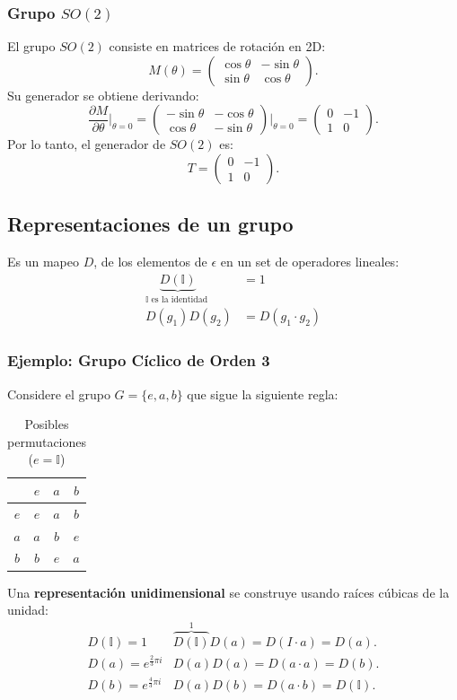 \documentclass[a4paper,12pt]{article}
\begin{document}
\subsubsection{Grupo \( SO(2) \)}
El grupo \( SO(2) \) consiste en matrices de rotación en 2D:
\[
M(\theta) = \begin{pmatrix}
\cos\theta & -\sin\theta \\
\sin\theta & \cos\theta
\end{pmatrix}.
\]
Su generador se obtiene derivando:
\[
\frac{\partial M}{\partial \theta} \bigg|_{\theta=0} = \begin{pmatrix}
-\sin\theta & -\cos\theta \\
\cos\theta & -\sin\theta
\end{pmatrix} \bigg|_{\theta=0} = \begin{pmatrix}
0 & -1 \\
1 & 0
\end{pmatrix}.
\]
Por lo tanto, el generador de \( SO(2) \) es:
\[
T = \begin{pmatrix}
0 & -1 \\
1 & 0
\end{pmatrix}.
\]

\subsection{Representaciones de un grupo}
Es un mapeo $D$, de los elementos de $\epsilon $ 
en un set de operadores lineales: 
\begin{align*}
\underbrace{D(\mathbb{I})}_{\mathbb{I}\text{ es la identidad }} &= 1 \tag{1}\\
D(g_1)D(g_2) &= D(g_1\cdot g_2) \tag{2}
\end{align*}
\subsubsection{Ejemplo: Grupo Cíclico de Orden 3}
 Considere el grupo $G = \{e, a, b\}$ que sigue la siguiente regla:
\begin{center}
    \begin{table}[h]
    \centering
    \begin{tabular}{c||ccc}
         & $e$& $a$& $b$\\
        \hline \hline
        $e$& $e$& $a$& $b$\\
        $a$& $a$& $b$& $e$\\
        $b$& $b$& $e$& $a$\\
    \end{tabular}
\caption{Posibles permutaciones ($e = \mathbb{I}$)}
\end{table} 
 
\end{center}
Una \textbf{representación unidimensional} se construye usando raíces cúbicas de la unidad:
\[
\begin{array}{cc}
     D(\mathbb{I }) =1& \overbrace{D(\mathbb{I})}^{1} D(a)  = D(I\cdot a ) = D(a).   \\
     D( a) = e^{\frac{2 }{3} \pi i}&  D(a) D(a) = D(a\cdot a) = D(b).\\
     D(b) = e^{\frac{4}{3}\pi i } & D(a)D(b) = D(a\cdot b) = D(\mathbb{I}).
\end{array}
\]
\end{document}
